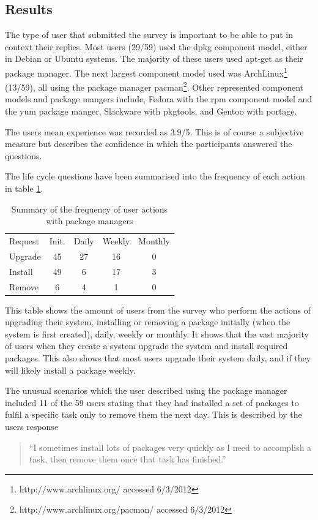 \subsection{Results}
The type of user that submitted the survey is important to be able to put in context their replies.
Most users (29/59) used the dpkg component model, either in Debian or Ubuntu systems.
The majority of these users used apt-get as their package manager.
The next largest component model used was ArchLinux\footnote{http://www.archlinux.org/ accessed 6/3/2012} (13/59),
all using the package manager pacman\footnote{http://www.archlinux.org/pacman/ accessed 6/3/2012}.
Other represented component models and package mangers include, Fedora with the rpm component model and the yum package manger,
Slackware with pkgtools, and Gentoo with portage.

The users mean experience was recorded as 3.9/5.
This is of course a subjective measure but describes the confidence in which the participants answered the questions. 

The life cycle questions have been summarised into the frequency of each action in table \ref{strat.tblaction}.

\begin{table}[htp]
\begin{tabular}{l | c | c | c | c |}
Request & Init. & Daily & Weekly & Monthly \\
Upgrade  & 45 & 27 & 16 & 0 \\
Install & 49 & 6 & 17 & 3 \\
Remove & 6 & 4 & 1 & 0\\
\end{tabular}
\caption{Summary of the frequency of user actions with package managers}
\label{strat.tblaction}
\end{table}

This table shows the amount of users from the survey who perform the actions of upgrading their system, installing or removing a package 
initially (when the system is first created), daily, weekly or monthly.
It shows that the vast majority of users when they create a system upgrade the system and install required packages.
This also shows that most users upgrade their system daily, and if they will likely install a package weekly.

The unusual scenarios which the user described using the package manager included 
11 of the 59 users stating that they had installed a set of packages to fulfil a specific task only to remove them the next day.
This is described by the users response 
\begin{quote}
``I sometimes install lots of packages very quickly as I need to accomplish a task, then remove them once that task has finished.''
\end{quote}

